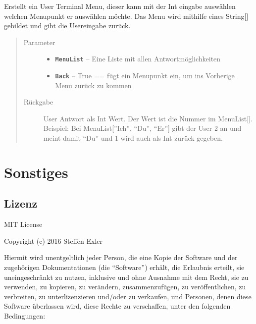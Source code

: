 \documentclass[letterpaper,10pt,ngerman]{sphinxmanual}
\begin{document}
\begin{fulllineitems}
\label{com/linuxluigi/polynomial/TerminalInterface:com.linuxluigi.polynomial.TerminalInterface.ShowMenu(String__, boolean)}
Erstellt ein User Terminal Menu, dieser kann mit der Int eingabe auswählen welchen Menupunkt er auswählen möchte. Das Menu wird mithilfe eines String{[}{]} gebildet und gibt die Usereingabe zurück.
\begin{quote}\begin{description}
\item[{Parameter}] \leavevmode\begin{itemize}
\item {} 
\textbf{\texttt{MenuList}} -- Eine Liste mit allen Antwortmöglichkeiten

\item {} 
\textbf{\texttt{Back}} -- True == fügt ein Menupunkt ein, um ins Vorherige Menu zurück zu kommen

\end{itemize}

\item[{Rückgabe}] \leavevmode
User Antwort als Int Wert. Der Wert ist die Nummer im MenuList{[}{]}. Beispiel: Bei MenuList{[}''Ich'', ``Du'', ``Er''{]} gibt der User 2 an und meint damit ``Du'' und 1 wird auch als Int zurück gegeben.

\end{description}\end{quote}

\end{fulllineitems}



\chapter{Sonstiges}
\label{index:sonstiges}

\section{Lizenz}
\label{license:lizenz}\label{license::doc}
MIT License

Copyright (c) 2016 Steffen Exler

Hiermit wird unentgeltlich jeder Person, die eine Kopie der Software und der zugehörigen Dokumentationen (die ``Software'') erhält, die Erlaubnis erteilt, sie uneingeschränkt zu nutzen, inklusive und ohne Ausnahme mit dem Recht, sie zu verwenden, zu kopieren, zu verändern, zusammenzufügen, zu veröffentlichen, zu verbreiten, zu unterlizenzieren und/oder zu verkaufen, und Personen, denen diese Software überlassen wird, diese Rechte zu verschaffen, unter den folgenden Bedingungen:
\end{document}
